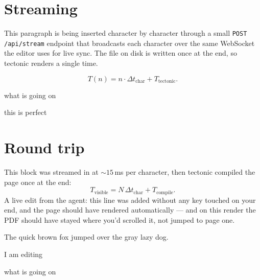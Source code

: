 \documentclass[11pt]{article}
\begin{document}
\section*{Streaming}

This paragraph is being inserted character by character through a small
\texttt{POST /api/stream} endpoint that broadcasts each character over
the same WebSocket the editor uses for live sync. The file on disk is
written once at the end, so tectonic renders a single time.

\[
  T(n) = n \cdot \Delta t_{\text{char}} + T_{\text{tectonic}}.
\]

what is going on

this is perfect


\section*{Round trip}

This block was streamed in at $\sim 15$\,ms per character, then tectonic compiled the page once at the end:
\[
  T_{\text{visible}} = N \,\Delta t_{\text{char}} + T_{\text{compile}}.
\]
A live edit from the agent: this line was added without any key touched
on your end, and the page should have rendered automatically --- and on this render the
PDF should have stayed where you'd scrolled it, not jumped to page one.

The quick brown fox jumped over the gray lazy dog.


I am editing

what is going on
\end{document}
